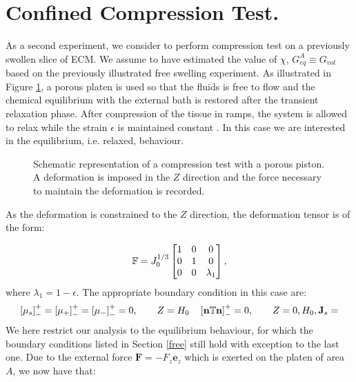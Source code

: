 \section{Confined Compression Test.}
\label{excomp}
As a second experiment, we consider to perform compression test on a previously swollen slice of ECM. We assume to have estimated the value of $\chi$, $G^A_{eq}\equiv G_{vol}$ based on the previously illustrated free swelling experiment. As illustrated in Figure \ref{confcomp}, a porous platen is used so that the fluids is free to flow and the chemical equilibrium with the external bath is restored after the transient relaxation phase. After compression of the tissue in ramps, the system is allowed to relax while the strain $\epsilon$ is maintained constant \cite{Netti}. In this case we are interested in the equilibrium, i.e. relaxed, behaviour. 

\begin{figure}[h]
	\centering
	\def\svgwidth{0.89\linewidth}
	
	\vspace{2mm}
	\caption{Schematic representation of a compression test with a porous piston. A deformation is imposed in the $Z$ direction and the force necessary to maintain the deformation is recorded. }
	\label{confcomp}
\end{figure}

As the deformation is constrained to the $Z$ direction, the deformation tensor is of the form:

\begin{equation}
\mathbb{F}=J_0^{1/3}\begin{bmatrix}
1 &0&0\\
0&1&0\\
0&0& \lambda_1
\end{bmatrix},
\label{F} 
\end{equation}
where $\lambda_1 = 1 - \epsilon$. The appropriate boundary condition in this case are:
\begin{equation}
\left[\mu_s\right]^+_-=\left[\mu_+\right]^+_-=\left[\mu_-\right]^+_-=0, \qquad Z=H_0\\
\quad \left[\mathbf{n} \mathbb{T}\mathbf{n}\right]^+_-=0, \qquad Z=0,H_0,\\
\mathbf{J}_s=
\end{equation}
We here restrict our analysis to the equilibrium behaviour, for which the boundary conditions listed in Section \ref{free} still hold with exception to the last one. Due to the external force $\mathbf{F}= -F_z \mathbf{e}_z$ which is exerted on the platen of area $A$, we now have that:

